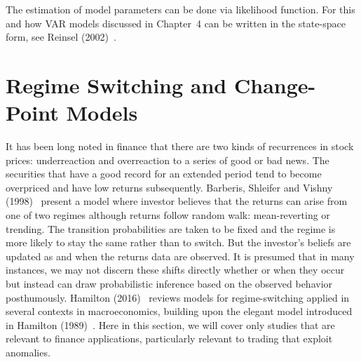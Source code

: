 The estimation of model parameters can be done via likelihood function. For this and how VAR models discussed in Chapter~4 can be written in the state-space form, see Reinsel (2002)~\cite{2002reinsel}.



\section{Regime Switching and Change-Point Models}


It has been long noted in finance that there are two kinds of recurrences in stock prices: underreaction and overreaction to a series of good or bad news. The securities that have a good record for an extended period tend to become overpriced and have low returns subsequently. Barberis, Shleifer and Vishny (1998)~\cite{vishny} present a model where investor believes that the returns can arise from one of two regimes although returns follow random walk: mean-reverting or trending. The transition probabilities are taken to be fixed and the regime is more likely to stay the same rather than to switch. But the investor's beliefs are updated as and when the returns data are observed. It is presumed that in many instances, we may not discern these shifts directly whether or when they occur but instead can draw probabilistic inference based on the observed behavior posthumously. Hamilton (2016)~\cite{jdham} reviews models for regime-switching applied in several contexts in macroeconomics, building upon the elegant model introduced in Hamilton (1989)~\cite{89ham}. Here in this section, we will cover only studies that are relevant to finance applications, particularly relevant to trading that exploit anomalies. 


